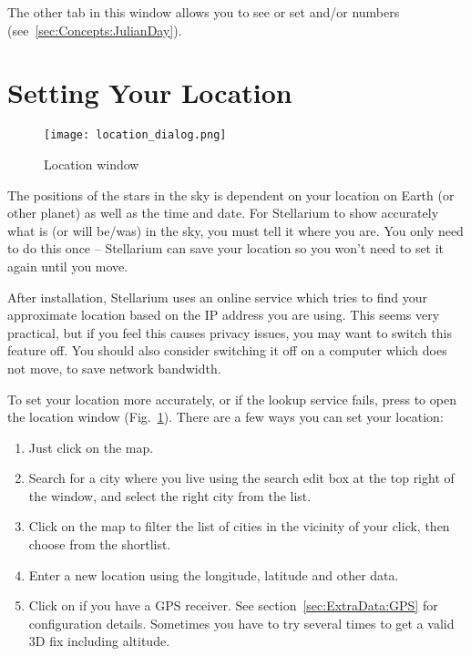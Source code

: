 The other tab in this window allows you to see or set
 and/or  numbers
(see~\ref{sec:Concepts:JulianDay}).

\section{Setting Your Location}
\label{sec:gui:location}

\begin{figure}[htb]
\centering\texttt{[image: location\_dialog.png]}
\caption{Location window}
\label{fig:gui:location}
\end{figure}

\noindent The positions of the stars in the sky is dependent on your location on
Earth (or other planet) as well as the time and date. For Stellarium to
show accurately what is (or will be/was) in the sky, you must tell it
where you are. You only need to do this once -- Stellarium can save your
location so you won't need to set it again until you move.

After installation, Stellarium uses an online service which tries to
find your approximate location based on the IP address you are
using. This seems very practical, but if you feel this causes privacy
issues, you may want to switch this feature off. You should also consider 
switching it off on a computer which does not move, to save network bandwidth.

To set your location more accurately, or if the lookup service fails,
press  to open the location window (Fig.~\ref{fig:gui:location}). 
There are a few ways you can set your location:

\begin{enumerate}
\item Just click on the map.
\item Search for a city where you live using the search edit box at
  the top right of the window, and select the right city from the
  list.
\item Click on the map to filter the list of cities in the vicinity of
  your click, then choose from the shortlist.
\item Enter a new location using the longitude, latitude and other
  data.
\item Click on  if you have a GPS receiver. 
  See section~\ref{sec:ExtraData:GPS} for configuration details. 
  Sometimes you have to try several times to get a valid 3D fix including altitude.
\end{enumerate}

